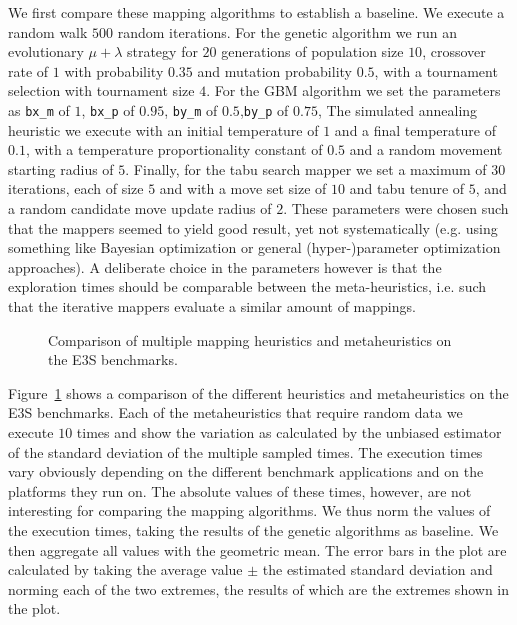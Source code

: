 We first compare these mapping algorithms to establish a baseline. 
We execute a random walk $500$ random iterations.
For the genetic algorithm we run an evolutionary $\mu + \lambda$ strategy for $20$ generations of population size $10$, crossover rate of $1$ with probability $0.35$ and mutation probability $0.5$, with a tournament selection with tournament size $4$.
For the \ac{GBM} algorithm we set the parameters as \texttt{bx\_m} of $1$, \texttt{bx\_p} of $0.95$, \texttt{by\_m} of $0.5$,\texttt{by\_p} of $0.75$, 
The simulated annealing heuristic we execute with an initial temperature of $1$ and a final temperature of $0.1$, with a temperature proportionality constant of $0.5$  and a random movement starting radius of $5$.
Finally, for the tabu search mapper we set a maximum of $30$ iterations, each of size $5$ and with a move set size of $10$ and tabu tenure of $5$, and a random candidate move update radius of $2$.
These parameters were chosen such that the mappers seemed to yield good result, yet not systematically (e.g. using something like Bayesian optimization or general (hyper-)parameter optimization approaches).
A deliberate choice in the parameters however is that the exploration times should be comparable between the meta-heuristics, i.e. such that the iterative mappers evaluate a similar amount of mappings.

\begin{figure}[h]
	\centering
   \resizebox{0.95\textwidth}{!}{}
	\caption{Comparison of multiple mapping heuristics and metaheuristics on the \ac{E3S} benchmarks.}
	\label{fig:metric_comparison}
\end{figure}

Figure~\ref{fig:metric_comparison} shows a comparison of the different heuristics and metaheuristics on the \ac{E3S} benchmarks.
Each of the metaheuristics that require random data we execute $10$ times and show the variation as calculated by the unbiased estimator of the standard deviation of the multiple sampled times.
The execution times vary obviously depending on the different benchmark applications and on the platforms they run on.
The absolute values of these times, however, are not interesting for comparing the mapping algorithms.
We thus norm the values of the execution times, taking the results of the genetic algorithms as baseline.
We then aggregate all values with the geometric mean.
The error bars in the plot are calculated by taking the average value $\pm$ the estimated standard deviation and norming each of the two extremes, the results of which are the extremes shown in the plot.


